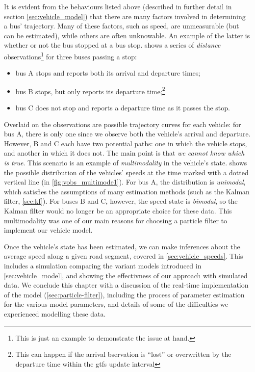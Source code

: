 It is evident from the behaviours listed above (described in further detail in section \cref{sec:vehicle_model}) that there are many factors involved in determining a bus' trajectory. Many of these factors, such as speed, are unmeasurable (but can be estimated), while others are often unknowable. An example of the latter is whether or not the bus stopped at a bus stop.  shows a series of \emph{distance} observations\footnote{This is just an example to demonstrate the issue at hand.} for three buses passing a stop:
\begin{itemize}
\item bus A stops and reports both its arrival and departure times;
\item bus B stops, but only reports its departure time;\footnote{This can happen if the arrival bservation is ``lost'' or overwritten by the departure time within the \gls{gtfs} update interval}
\item bus C does not stop and reports a departure time as it passes the stop.
\end{itemize}
Overlaid on the observations are possible trajectory curves for each vehicle: for bus A, there is only one since we observe both the vehicle's arrival and departure. However, B and C each have two potential paths: one in which the vehicle stops, and another in which it does not. The main point is that \emph{we cannot know which is true}. This scenario is an example of \emph{multimodality} in the vehicle's state.  shows the possible distribution of the vehicles' speeds at the time marked with a dotted vertical line (in \cref{fig:vobs_multimode1}). For bus A, the distribution is \emph{unimodal}, which satisfies the assumptions of many estimation methods (such as the Kalman filter, \cref{sec:kf}). For buses B and C, however, the speed state is \emph{bimodal}, so the Kalman filter would no longer be an appropriate choice for these data. This multimodality was one of our main reasons for choosing a particle filter to implement our vehicle model.

Once the vehicle's state has been estimated, we can make inferences about the average speed along a given road segment, covered in \cref{sec:vehicle_speeds}. This includes a simulation comparing the variant models introduced in \cref{sec:vehicle_model}, and showing the effectivness of our approach with simulated data. We conclude this chapter with a discussion of the real-time implementation of the model (\cref{sec:particle-filter}), including the process of parameter estimation for the various model parameters, and details of some of the difficulties we experienced modelling these data.










